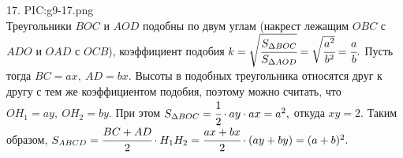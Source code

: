 17. {{PIC:g9-17.png}}\\
Треугольники $BOC$ и $AOD$ подобны по двум углам (накрест лежащим $OBC$ с $ADO$ и $OAD$ с $OCB$), коэффициент подобия $k=\sqrt{\cfrac{S_{\Delta BOC}}{S_{\Delta AOD}}}=\sqrt{\cfrac{a^2}{b^2}}=\cfrac{a}{b}.$ Пусть тогда $BC=ax,\ AD=bx.$ Высоты в подобных треугольника относятся друг к другу с тем же коэффициентом подобия, поэтому можно считать, что $OH_1=ay,\ OH_2=by.$ При этом $S_{\Delta BOC}=\cfrac{1}{2}\cdot ay\cdot ax=a^2,$ откуда $xy=2.$ Таким образом, $S_{ABCD}=\cfrac{BC+AD}{2}\cdot H_1H_2=\cfrac{ax+bx}{2}\cdot(ay+by)=(a+b)^2.$\\
